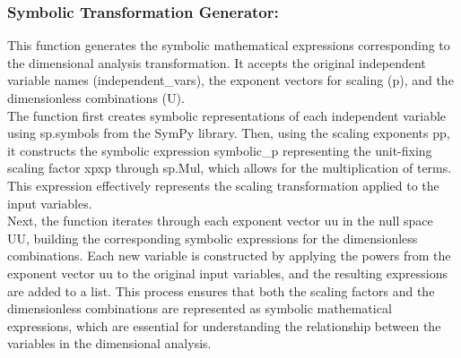 \documentclass{article}
\begin{document}
\subsubsection{Symbolic Transformation Generator: }

This function generates the symbolic mathematical expressions corresponding to the dimensional analysis transformation. It accepts the original independent variable names (independent\_vars), the exponent vectors for scaling (p), and the dimensionless combinations (U).\\

The function first creates symbolic representations of each independent variable using sp.symbols from the SymPy library. Then, using the scaling exponents pp, it constructs the symbolic expression symbolic\_p representing the unit-fixing scaling factor xpxp through sp.Mul, which allows for the multiplication of terms. This expression effectively represents the scaling transformation applied to the input variables.\\

Next, the function iterates through each exponent vector uu in the null space UU, building the corresponding symbolic expressions for the dimensionless combinations. Each new variable is constructed by applying the powers from the exponent vector uu to the original input variables, and the resulting expressions are added to a list. This process ensures that both the scaling factors and the dimensionless combinations are represented as symbolic mathematical expressions, which are essential for understanding the relationship between the variables in the dimensional analysis.\\
\end{document}
